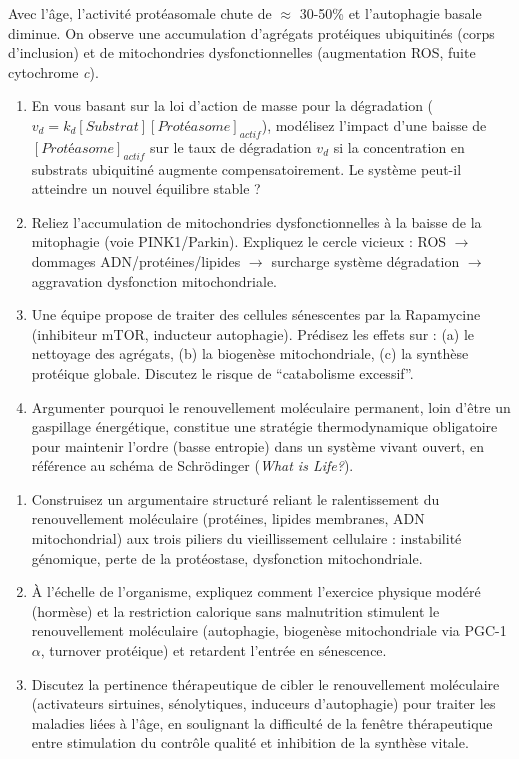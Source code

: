 \documentclass[11pt]{article}
\begin{document}
\begin{exercice}
Avec l'âge, l'activité protéasomale chute de $\approx$ 30-50\% et l'autophagie basale diminue. On observe une accumulation d'agrégats protéiques ubiquitinés (corps d'inclusion) et de mitochondries dysfonctionnelles (augmentation ROS, fuite cytochrome \textit{c}).

\begin{enumerate}
\item En vous basant sur la loi d'action de masse pour la dégradation ($v_d = k_d [Substrat][Protéasome]_{actif}$), modélisez l'impact d'une baisse de $[Protéasome]_{actif}$ sur le taux de dégradation $v_d$ si la concentration en substrats ubiquitiné augmente compensatoirement. Le système peut-il atteindre un nouvel équilibre stable ?
\item Reliez l'accumulation de mitochondries dysfonctionnelles à la baisse de la mitophagie (voie PINK1/Parkin). Expliquez le cercle vicieux : ROS $\rightarrow$ dommages ADN/protéines/lipides $\rightarrow$ surcharge système dégradation $\rightarrow$ aggravation dysfonction mitochondriale.
\item Une équipe propose de traiter des cellules sénescentes par la Rapamycine (inhibiteur mTOR, inducteur autophagie). Prédisez les effets sur : (a) le nettoyage des agrégats, (b) la biogenèse mitochondriale, (c) la synthèse protéique globale. Discutez le risque de ``catabolisme excessif''.
\item Argumenter pourquoi le renouvellement moléculaire permanent, loin d'être un gaspillage énergétique, constitue une stratégie thermodynamique obligatoire pour maintenir l'ordre (basse entropie) dans un système vivant ouvert, en référence au schéma de Schrödinger (\textit{What is Life?}).
\end{enumerate}
\end{exercice}

\begin{exercice}
\begin{enumerate}
\item Construisez un argumentaire structuré reliant le ralentissement du renouvellement moléculaire (protéines, lipides membranes, ADN mitochondrial) aux trois piliers du vieillissement cellulaire : instabilité génomique, perte de la protéostase, dysfonction mitochondriale.
\item À l'échelle de l'organisme, expliquez comment l'exercice physique modéré (hormèse) et la restriction calorique sans malnutrition stimulent le renouvellement moléculaire (autophagie, biogenèse mitochondriale via PGC-1$\alpha$, turnover protéique) et retardent l'entrée en sénescence.
\item Discutez la pertinence thérapeutique de cibler le renouvellement moléculaire (activateurs sirtuines, sénolytiques, induceurs d'autophagie) pour traiter les maladies liées à l'âge, en soulignant la difficulté de la fenêtre thérapeutique entre stimulation du contrôle qualité et inhibition de la synthèse vitale.
\end{enumerate}
\end{exercice}
\end{document}
